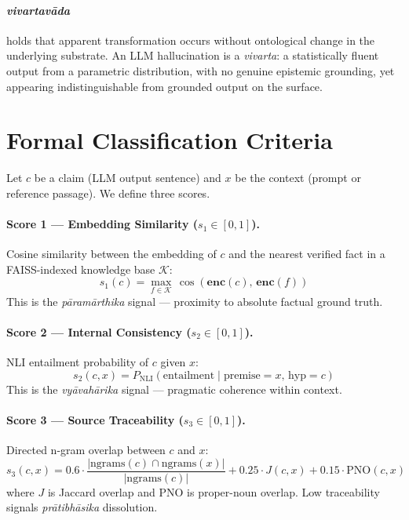 \documentclass[11pt]{article}
\newcommand{\param}{\textcolor{paramcol}{\textit{pāramārthika}}}
\newcommand{\vyav}{\textcolor{vyavcol}{\textit{vyāvahārika}}}
\newcommand{\prati}{\textcolor{praticol}{\textit{prātibhāsika}}}
\newcommand{\vivarta}{\textit{vivartavāda}}
\begin{document}
\paragraph{\vivarta{}} holds that apparent transformation occurs without
ontological change in the underlying substrate. An LLM hallucination is a
\textit{vivarta}: a statistically fluent output from a parametric distribution,
with no genuine epistemic grounding, yet appearing indistinguishable from
grounded output on the surface.

\section{Formal Classification Criteria}
\label{sec:formal}

Let $c$ be a claim (LLM output sentence) and $x$ be the context (prompt or
reference passage). We define three scores.

\paragraph{Score 1 --- Embedding Similarity ($s_1 \in [0,1]$).}
Cosine similarity between the embedding of $c$ and the nearest verified fact
in a FAISS-indexed knowledge base $\mathcal{K}$:
\begin{equation}
  s_1(c) = \max_{f \in \mathcal{K}}\, \cos\!\left(\mathbf{enc}(c),\, \mathbf{enc}(f)\right)
\end{equation}
This is the \param{} signal --- proximity to absolute factual ground truth.

\paragraph{Score 2 --- Internal Consistency ($s_2 \in [0,1]$).}
NLI entailment probability of $c$ given $x$:
\begin{equation}
  s_2(c, x) = P_\mathrm{NLI}(\mathrm{entailment} \mid \mathrm{premise}{=}x,\, \mathrm{hyp}{=}c)
\end{equation}
This is the \vyav{} signal --- pragmatic coherence within context.

\paragraph{Score 3 --- Source Traceability ($s_3 \in [0,1]$).}
Directed n-gram overlap between $c$ and $x$:
\begin{equation}
  s_3(c,x) = 0.6\cdot\frac{|\mathrm{ngrams}(c)\cap\mathrm{ngrams}(x)|}{|\mathrm{ngrams}(c)|}
             +0.25\cdot J(c,x) + 0.15\cdot\mathrm{PNO}(c,x)
\end{equation}
where $J$ is Jaccard overlap and $\mathrm{PNO}$ is proper-noun overlap.
Low traceability signals \prati{} dissolution.
\end{document}
